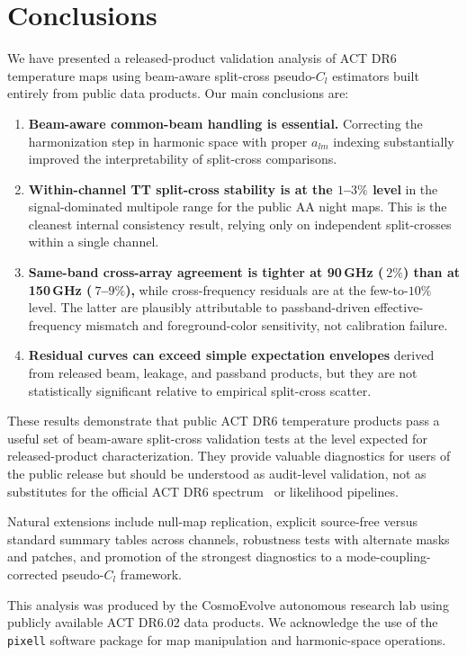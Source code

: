 \documentclass[twocolumn,showpacs,preprintnumbers,amsmath,amssymb,floatfix,prd]{revtex4-2}
\def\ell{l}%
\def\sim{~}%
\begin{document}
\section{Conclusions}\label{sec:conclusions}

We have presented a released-product validation analysis of ACT DR6 temperature maps using beam-aware split-cross pseudo-$C_\ell$ estimators built entirely from public data products.
Our main conclusions are:

\begin{enumerate}
\item \textbf{Beam-aware common-beam handling is essential.} Correcting the harmonization step in harmonic space with proper $a_{\ell m}$ indexing substantially improved the interpretability of split-cross comparisons.

\item \textbf{Within-channel TT split-cross stability is at the $1$--$3\%$ level} in the signal-dominated multipole range for the public AA night maps. This is the cleanest internal consistency result, relying only on independent split-crosses within a single channel.

\item \textbf{Same-band cross-array agreement is tighter at 90\,GHz ($\sim\!2\%$) than at 150\,GHz ($\sim\!7$--$9\%$),} while cross-frequency residuals are at the few-to-$10\%$ level. The latter are plausibly attributable to passband-driven effective-frequency mismatch and foreground-color sensitivity, not calibration failure.

\item \textbf{Residual curves can exceed simple expectation envelopes} derived from released beam, leakage, and passband products, but they are not statistically significant relative to empirical split-cross scatter.
\end{enumerate}

These results demonstrate that public ACT DR6 temperature products pass a useful set of beam-aware split-cross validation tests at the level expected for released-product characterization.
They provide valuable diagnostics for users of the public release but should be understood as audit-level validation, not as substitutes for the official ACT DR6 spectrum~\cite{Louis2025} or likelihood pipelines.

Natural extensions include null-map replication, explicit source-free versus standard summary tables across channels, robustness tests with alternate masks and patches, and promotion of the strongest diagnostics to a mode-coupling-corrected pseudo-$C_\ell$ framework.

\begin{acknowledgments}
This analysis was produced by the CosmoEvolve autonomous research lab using publicly available ACT DR6.02 data products.
We acknowledge the use of the \texttt{pixell} software package for map manipulation and harmonic-space operations.
\end{acknowledgments}


\end{document}
